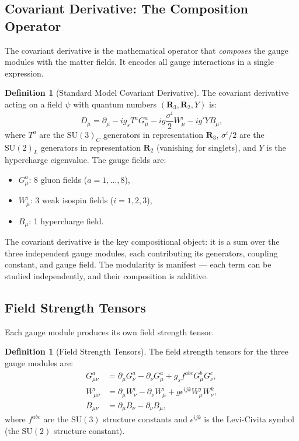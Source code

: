 \documentclass[12pt]{article}
\theoremstyle{definition}
\newtheorem{definition}[theorem]{Definition}
\theoremstyle{remark}
\newcommand{\su}[1]{\mathrm{SU}(#1)}
\newcommand{\dmu}{D_\mu}
\newcommand{\pmu}{\partial_\mu}
\begin{document}
\subsection{Covariant Derivative: The Composition Operator}

The covariant derivative is the mathematical operator that \emph{composes} the gauge modules with the matter fields. It encodes all gauge interactions in a single expression.

\begin{definition}[Standard Model Covariant Derivative]
\label{def:covariant-derivative}
The covariant derivative acting on a field $\psi$ with quantum numbers $(\mathbf{R}_3, \mathbf{R}_2, Y)$ is:
\begin{equation}
\label{eq:covariant-derivative}
\dmu = \pmu - i g_s T^a G^a_\mu - i g \frac{\sigma^i}{2} W^i_\mu - i g' Y B_\mu,
\end{equation}
where $T^a$ are the $\su{3}_C$ generators in representation $\mathbf{R}_3$, $\sigma^i/2$ are the $\su{2}_L$ generators in representation $\mathbf{R}_2$ (vanishing for singlets), and $Y$ is the hypercharge eigenvalue. The gauge fields are:
\begin{itemize}
\item $G^a_\mu$: 8 gluon fields ($a = 1, \ldots, 8$),
\item $W^i_\mu$: 3 weak isospin fields ($i = 1, 2, 3$),
\item $B_\mu$: 1 hypercharge field.
\end{itemize}
\end{definition}

The covariant derivative is the key compositional object: it is a sum over the three independent gauge modules, each contributing its generators, coupling constant, and gauge field. The modularity is manifest --- each term can be studied independently, and their composition is additive.

\subsection{Field Strength Tensors}

Each gauge module produces its own field strength tensor.

\begin{definition}[Field Strength Tensors]
\label{def:field-strengths}
The field strength tensors for the three gauge modules are:
\begin{align}
G^a_{\mu\nu} &= \pmu G^a_\nu - \partial_\nu G^a_\mu + g_s f^{abc} G^b_\mu G^c_\nu, \label{eq:gluon-fst} \\
W^i_{\mu\nu} &= \pmu W^i_\nu - \partial_\nu W^i_\mu + g \epsilon^{ijk} W^j_\mu W^k_\nu, \label{eq:w-fst} \\
B_{\mu\nu} &= \pmu B_\nu - \partial_\nu B_\mu, \label{eq:b-fst}
\end{align}
where $f^{abc}$ are the $\su{3}$ structure constants and $\epsilon^{ijk}$ is the Levi-Civita symbol (the $\su{2}$ structure constant).
\end{definition}
\end{document}
